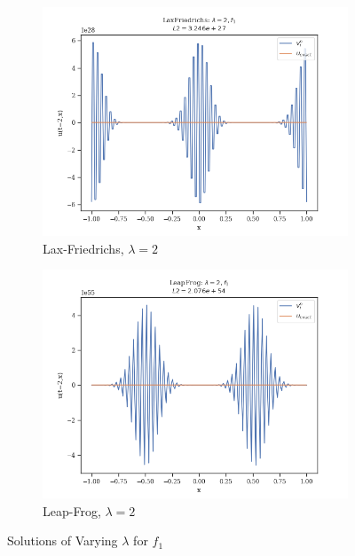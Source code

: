 \begin{figure}
\begin{subfigure}{0.3\linewidth}
        \includegraphics[width=\linewidth]{figures/LaxFriedrichs/LaxFriedrichs_lambda=2,f1}
        \caption{Lax-Friedrichs, $\lambda =2$}
    \end{subfigure}
    \hfill
    \begin{subfigure}{0.3\linewidth}
        \centering
        \includegraphics[width=\linewidth]{figures/LeapFrog/LeapFrog_lambda=2,f1}
        \caption{Leap-Frog, $\lambda =2$}
    \end{subfigure}
    \hfill

    \caption{Solutions of Varying $\lambda$ for $f_1$}
    \label{f1 figures}

\end{figure}

